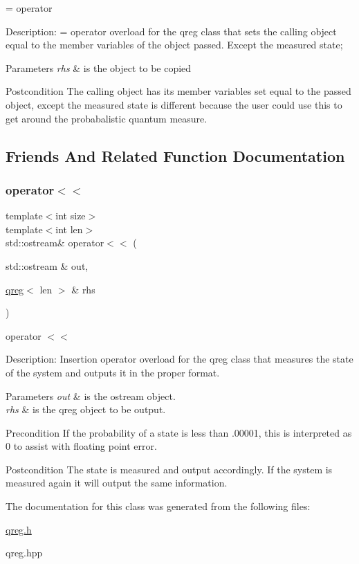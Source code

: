 = operator 

Description\+: = operator overload for the qreg class that sets the calling object equal to the member variables of the object passed. Except the measured state; 
\begin{DoxyParams}{Parameters}
{\em rhs} & is the object to be copied \\
\hline
\end{DoxyParams}
\begin{DoxyPostcond}{Postcondition}
The calling object has its member variables set equal to the passed object, except the measured state is different because the user could use this to get around the probabalistic quantum measure. 
\end{DoxyPostcond}


\subsection{Friends And Related Function Documentation}
\mbox{\label{classqreg_aab37e2039c27c6a674f5319cb72b0a6f}} 
\subsubsection{\texorpdfstring{operator$<$$<$}{operator<<}}
{\footnotesize\ttfamily template$<$int size$>$ \\
template$<$int len$>$ \\
std\+::ostream\& operator$<$$<$ (\begin{DoxyParamCaption}\item[{std\+::ostream \&}]{out,  }\item[{\hyperlink{classqreg}{qreg}$<$ len $>$ \&}]{rhs }\end{DoxyParamCaption})\hspace{0.3cm}{\ttfamily [friend]}}



operator $<$$<$ 

Description\+: Insertion operator overload for the qreg class that measures the state of the system and outputs it in the proper format. 
\begin{DoxyParams}{Parameters}
{\em out} & is the ostream object. \\
\hline
{\em rhs} & is the qreg object to be output. \\
\hline
\end{DoxyParams}
\begin{DoxyPrecond}{Precondition}
If the probability of a state is less than .00001, this is interpreted as 0 to assist with floating point error. 
\end{DoxyPrecond}
\begin{DoxyPostcond}{Postcondition}
The state is measured and output accordingly. If the system is measured again it will output the same information. 
\end{DoxyPostcond}


The documentation for this class was generated from the following files\+:\begin{DoxyCompactItemize}
\item 
\hyperlink{qreg_8h}{qreg.\+h}\item 
qreg.\+hpp\end{DoxyCompactItemize}

